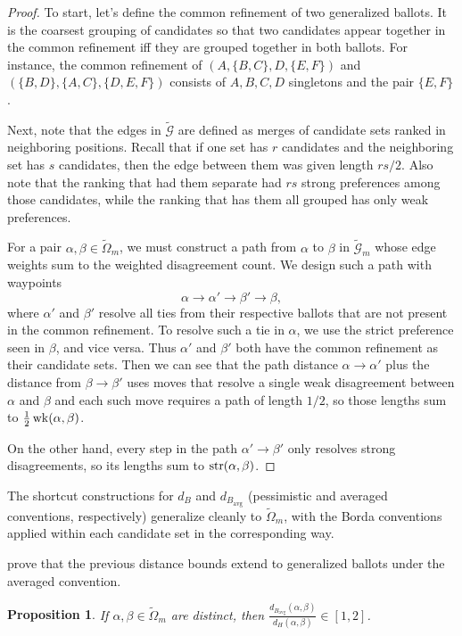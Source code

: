 \documentclass{amsart}
\newcommand{\WG}{\widetilde{\mathcal{G}}}
\newcommand{\WO}{\widetilde{\Omega}}
\newcommand{\str}{\mathop{\rm str}}
\newcommand{\wk}{\mathop{\rm wk}}
\theoremstyle{plain}
\newtheorem{proposition}[theorem]{Proposition}
\theoremstyle{definition}
\theoremstyle{remark}
\begin{document}
\begin{proof}
To start, let's define the common refinement of two generalized ballots.  It is the coarsest grouping of candidates so that two candidates appear together in the common refinement iff they are grouped together in both ballots.  For instance, the common refinement of $(A,\{B,C\},D,\{E,F\})$ and 
$(\{B,D\},\{A,C\},\{D,E,F\})$ consists of $A,B,C,D$ singletons and the pair $\{E,F\}$.  

Next, note that the edges in $\WG$ are defined as merges of candidate sets ranked in neighboring positions.  Recall that if one set has $r$ candidates and the neighboring set has $s$ candidates, then the edge between them was given length $rs/2$.  Also note that the ranking that had them separate had $rs$ strong preferences among those candidates, while the ranking that has them all grouped has only weak preferences.

For a pair $\alpha,\beta \in\WO_m$, we must construct a path from $\alpha$ to $\beta$ in $\WG_m$ whose edge weights sum to the weighted disagreement count.  
We design such a path with waypoints $$\alpha\rightarrow\alpha'\rightarrow\beta'\rightarrow \beta,$$ where $\alpha'$ and $\beta'$ resolve all ties from their respective ballots that are not present in the common refinement.  To resolve such a tie in $\alpha$, we use the strict preference seen in $\beta$, and vice versa.  Thus $\alpha'$ and $\beta'$ both have the common refinement as their candidate sets.  
Then we can see that the path distance  
$\alpha\to\alpha'$ plus the distance from $\beta\to\beta'$ uses moves that resolve a single weak disagreement between $\alpha$ and $\beta$ and each such move requires a path of length $1/2$, so those lengths sum to $\frac 12 \wk(\alpha,\beta)$.

On the other hand, every step in the path $\alpha'\to\beta'$ only resolves strong disagreements, so its lengths sum to $\str(\alpha,\beta)$.
\end{proof}

The shortcut constructions for $d_B$ and $d_{B_\text{avg}}$ (pessimistic and averaged conventions, respectively) generalize cleanly to $\WO_m$, with the Borda conventions applied within each candidate set in the corresponding way. 

\citet{Fagin_Kumar_Mahdian_Sivakumar_Vee_2006} prove that the previous distance bounds extend to generalized ballots  under the averaged convention.
\begin{proposition}\label{P:complete2} If $\alpha, \beta\in\WO_m$ are distinct, then 
$
\displaystyle\frac{d_{B_\text{avg}}(\alpha,\beta)}{d_{H}(\alpha,\beta)}\in[1,2]$.
\end{proposition}
\end{document}

